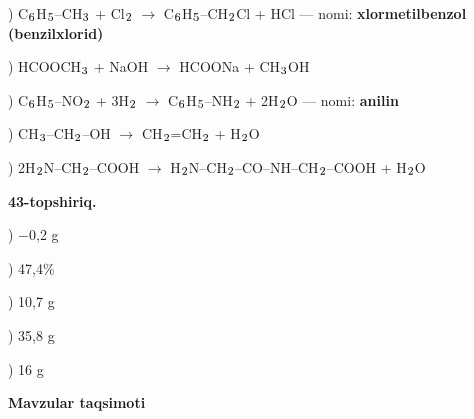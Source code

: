 \documentclass[11pt,a4paper]{article}
\renewcommand{\textsubscript}[1]{\ensuremath{_{\text{\fontsize{8}{8}\selectfont #1}}}}
\begin{document}
) C\textsubscript{6}H\textsubscript{5}--CH\textsubscript{3} + Cl\textsubscript{2} $\to$ C\textsubscript{6}H\textsubscript{5}--CH\textsubscript{2}Cl + HCl --- nomi: \textbf{xlormetilbenzol (benzilxlorid)}\par
{}) HCOOCH\textsubscript{3} + NaOH $\to$ HCOONa + CH\textsubscript{3}OH\par
{}) C\textsubscript{6}H\textsubscript{5}--NO\textsubscript{2} + 3H\textsubscript{2} $\to$ C\textsubscript{6}H\textsubscript{5}--NH\textsubscript{2} + 2H\textsubscript{2}O --- nomi: \textbf{anilin}\par
{}) CH\textsubscript{3}--CH\textsubscript{2}--OH $\to$ CH\textsubscript{2}=CH\textsubscript{2} + H\textsubscript{2}O\par
{}) 2H\textsubscript{2}N--CH\textsubscript{2}--COOH $\to$ H\textsubscript{2}N--CH\textsubscript{2}--CO--NH--CH\textsubscript{2}--COOH + H\textsubscript{2}O\par
\noindent\textbf{43-topshiriq.}\par
{}) $-$0,2 g\par
{}) 47,4\%\par
{}) 10,7 g\par
{}) 35,8 g\par
{}) 16 g\par
\par\bigskip\noindent\textbf{Mavzular taqsimoti}\par\smallskip
\end{document}
